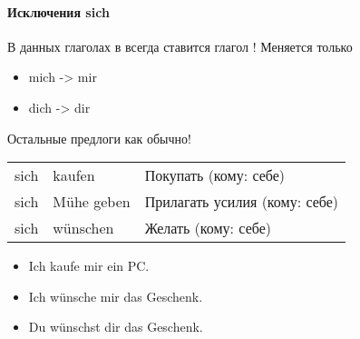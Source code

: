 \paragraph{Исключения sich \dat}

В данных глаголах в \dat всегда ставится глагол ! Меняется только 

\begin{itemize}
\item mich -> mir
\item dich -> dir
\end{itemize}

Остальные предлоги как обычно!
\begin{longtable}{ l l l }
	sich \dat & kaufen & Покупать (кому: себе) \\
	sich \dat & Mühe geben & Прилагать усилия (кому: себе) \\
	sich \dat & wünschen & Желать (кому: себе) \\
\end{longtable}

\begin{itemize}
\item Ich kaufe mir ein PC.
~\\ 
\item Ich wünsche mir das Geschenk.
~\\ 
\item Du wünschst dir das Geschenk.
~\\ 
\end{itemize}
